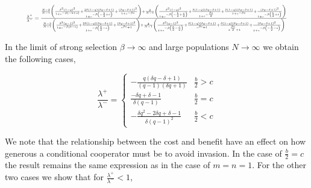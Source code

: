\documentclass[11pt]{article}
\theoremstyle{plainCl1}
\theoremstyle{plainCl2}
\begin{document}
\begin{equation}
  \resizebox{.9\textwidth}{!}
  {%
$\frac{\lambda^{+}}{\lambda^{-}} =
\frac{\frac{N - 3}{N-1} \left(\frac{\delta^{2} \left(1 - q\right)^{2}}{1 + e^{- \beta \left(- b + c\right)}} + \frac{2 \delta \left(1 - q\right) \left(\delta q - \delta + 1\right)}{1 + e^{- \beta \left(- \frac{b}{2} + c\right)}} + \frac{\left(\delta q - \delta + 1\right)^{2}}{1 + e^{- \beta c}}\right) 
+ \frac{2}{N-1} \left(\frac{\delta^{2} \left(1 - q\right)^{2}}{1 + e^{- \beta \left(- \frac{b}{2} + \frac{c}{2}\right)}} + \frac{\delta \left(1 - q\right) \left(\delta q - \delta + 1\right)}{1 + e^{- \frac{\beta c}{2}}} + \frac{\delta \left(1 - q\right) \left(\delta q - \delta + 1\right)}{1 + e^{- \beta c}} + \frac{\left(\delta q - \delta + 1\right)^{2}}{1 + e^{- \beta \left(\frac{b}{2} + c\right)}}\right)}
{\frac{N - 3}{N-1} \left(\frac{\delta^{2} \left(q - 1\right)^{2}}{1 + e^{- \beta \left(b - c\right)}} + \frac{2 \delta \left(1 - q\right) \left(\delta q - \delta + 1\right)}{1 + e^{- \beta \left(\frac{b}{2} - c\right)}} + \frac{\left(\delta q - \delta + 1\right)^{2}}{e^{\beta c} + 1}\right) + \frac{2}{N-1} \left(\frac{\delta^{2} \left(q - 1\right)^{2}}{1 + e^{- \beta \left(\frac{b}{2} - \frac{c}{2}\right)}} + \frac{\delta \left(1 - q\right) \left(\delta q - \delta + 1\right)}{e^{\beta c} + 1} + \frac{\delta \left(1 - q\right) \left(\delta q - \delta + 1\right)}{e^{\frac{\beta c}{2}} + 1} + \frac{\left(\delta q - \delta + 1\right)^{2}}{1 + e^{- \beta \left(- \frac{b}{2} - c\right)}}\right)}
$}
\end{equation}

In the limit of strong selection \(\beta \rightarrow \infty\) and large
populations \(N \rightarrow \infty \) we obtain the following cases,

\begin{equation}
\frac{\lambda^{+}}{\lambda^{-}} = 
\begin{cases}
  - \frac{q \left(\delta q - \delta + 1\right)}{\left(q - 1\right) \left(\delta q + 1\right)}  & \frac{b}{2} > c \\[0.5cm]
  \frac{- \delta q + \delta - 1}{\delta \left(q - 1\right)}  & \frac{b}{2} = c \\[0.5cm]
  - \frac{\delta q^{2} - 2 \delta q + \delta - 1}{\delta \left(q - 1\right)^{2}} & \frac{b}{2} < c
\end{cases}
\end{equation}

We note that the relationship between the cost and benefit have an effect on how
generous a conditional cooperator must be to avoid invasion. In the case of
\(\frac{b}{2}=c\) the result remains the same expression as in the case of
\(m=n=1\). For the other two cases we show that for
\(\frac{\lambda^{+}}{\lambda^{-}} < 1\),
\end{document}
